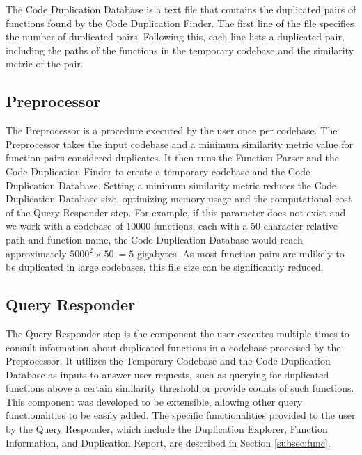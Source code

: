 The Code Duplication Database is a text file that contains the duplicated pairs of functions found by the Code Duplication Finder. The first line of the file specifies the number of duplicated pairs. Following this, each line lists a duplicated pair, including the paths of the functions in the temporary codebase and the similarity metric of the pair.

\subsection{Preprocessor}
\label{subsec:setup}

The Preprocessor is a procedure executed by the user once per codebase. 
The Preprocessor takes the input codebase and a minimum similarity metric value for function pairs considered duplicates. 
It then runs the Function Parser and the Code Duplication Finder to create a temporary codebase and the Code Duplication Database. 
Setting a minimum similarity metric reduces the Code Duplication Database size, optimizing memory usage and the computational 
cost of the Query Responder step. For example, if this parameter does not exist and we work with a codebase of $10000$ functions, 
each with a 50-character relative path and function name, the Code Duplication Database would reach approximately $5000^2 \times 50 ~= 5$ gigabytes. 
As most function pairs are unlikely to be duplicated in large codebases, this file size can be significantly reduced.

\subsection{Query Responder}

The Query Responder step is the component the user executes multiple times to consult information 
about duplicated functions in a codebase processed by the Preprocessor. 
It utilizes the Temporary Codebase and the Code Duplication Database as inputs to answer user requests, 
such as querying for duplicated functions above a certain similarity threshold or provide counts of such functions.
This component was developed to be extensible, allowing other query functionalities to be easily added. 
The specific functionalities provided to the user by the Query Responder, which include the 
Duplication Explorer, Function Information, and Duplication Report, are described in Section \ref{subsec:func}.

